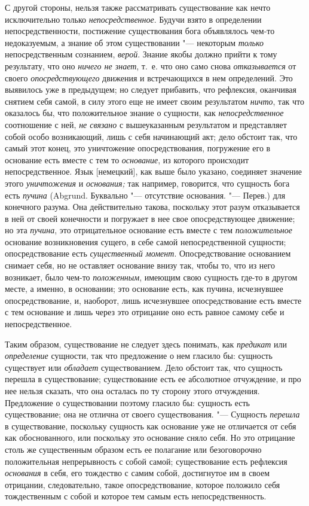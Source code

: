 С другой стороны, нельзя также рассматривать существование как нечто
исключительно только {\em непосредственное}. Будучи
взято в определении непосредственности, постижение существования бога
объявлялось чем-то недоказуемым, а знание об этом существовании "--- некоторым
{\em только} непосредственным сознанием,
{\em верой}. Знание якобы должно прийти к тому
результату, что оно {\em ничего не знает}, т.~е. что
оно само снова {\em отказывается} от своего
{\em опосредствующего} движения и встречающихся в нем
определений. Это выявилось уже в предыдущем; но следует прибавить, что
рефлексия, оканчивая снятием себя самой, в силу этого еще не имеет своим
результатом {\em ничто}, так что оказалось бы, что
положительное знание о сущности, как
{\em непосредственное} соотношение с ней,
{\em не связано} с вышеуказанным результатом и
представляет собой особо возникающий, лишь с себя начинающий акт; дело
обстоит так, что самый этот конец, это уничтожение опосредствования,
погружение его в основание есть вместе с тем то
{\em основание}, из которого происходит
непосредственное. Язык [немецкий], как выше было указано, соединяет
значение этого {\em уничтожения} и
{\em основания;} так например, говорится, что сущность
бога есть {\em пучина} (Abgrund. Буквально "--- отсутствие
основания. "--- Перев.) для конечного разума. Она действительно такова,
поскольку этот разум отказывается в ней от своей конечности и погружает в
нее свое опосредствующее движение; но эта {\em пучина},
это отрицательное основание есть вместе с тем
{\em положительное} основание возникновения сущего, в
себе самой непосредственной сущности; опосредствование есть
{\em существенный момент}. Опосредствование основанием
снимает себя, но не оставляет основание внизу так, чтобы то, что из него
возникает, было чем-то {\em положенным}, имеющим свою
сущность где-то в другом месте, а именно, в основании; это основание есть,
как пучина, исчезнувшее опосредствование, и, наоборот, лишь исчезнувшее
опосредствование есть вместе с тем основание и лишь через это отрицание оно
есть равное самому себе и непосредственное.

Таким образом, существование не следует здесь понимать, как
{\em предикат} или
{\em определение} сущности, так что предложение о нем
гласило бы: сущность существует или {\em обладает}
существованием. Дело обстоит так, что сущность перешла в существование;
существование есть ее абсолютное отчуждение, и про нее нельзя сказать, что
она осталась по ту сторону этого отчуждения. Предложение о существовании
поэтому гласило бы: сущность есть существование; она не отлична от своего
существования. "--- Сущность {\em перешла} в
существование, поскольку сущность как основание уже не отличается от себя
как обоснованного, или поскольку это основание сняло себя. Но это отрицание
столь же существенным образом есть ее полагание или безоговорочно
положительная непрерывность с собой самой; существование есть рефлексия
{\em основания} в себя, его тождество с самим собой,
достигнутое им в своем отрицании, следовательно, такое опосредствование,
которое положило себя тождественным с собой и которое тем самым есть
непосредственность.

